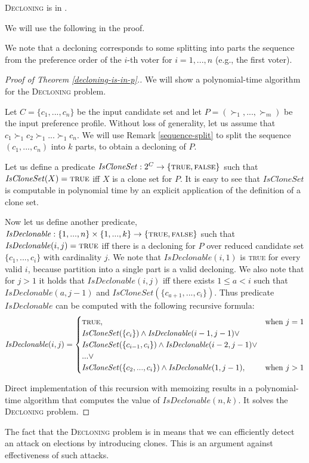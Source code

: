 \begin{thm} \label{decloning-is-in-p}
\textsc{Decloning} is in \p.
\end{thm}

We will use the following in the proof.

\begin{rmrk} \label{sequence-split}
We note that a decloning corresponds to some splitting into parts
the sequence from the preference order of the $i$-th voter for $i=1,...,n$
(e.g., the first voter).
\end{rmrk}

\begin{proof}[Proof of Theorem \ref{decloning-is-in-p}.]
We will show a polynomial-time algorithm for the \textsc{Decloning} problem.

Let $C = \{c_1, ..., c_n\}$ be the input candidate set
and let $P = (\succ_1, ... , \succ_m)$ be the input preference profile.
Without loss of generality, let us assume that $c_1 \succ_1 c_2 \succ_1 ... \succ_1 c_n$.
We will use Remark \ref{sequence-split} to split the sequence $(c_1, ..., c_n)$
into $k$ parts, to obtain a decloning of $P$.

Let us define a predicate
$\mathit{IsCloneSet}: 2^C \rightarrow \{\text{\textsc{true}},\text{\textsc{false}}\}$
such that $\mathit{IsCloneSet}(X) = \text{\textsc{true}}$ iff $X$ is a clone set for $P$.
It is easy to see that $\mathit{IsCloneSet}$ is computable in polynomial time
by an explicit application of the definition of a clone set.

Now let us define another predicate,
$\mathit{IsDeclonable}: \{1,...,n\}\times\{1,...,k\} \rightarrow \{\text{\textsc{true}},\text{\textsc{false}}\}$
such that $\mathit{IsDeclonable}(i,j) = \text{\textsc{true}}$
iff there is a decloning for $P$ over reduced candidate set $\{c_1,...,c_i\}$
with cardinality $j$.
We note that $\mathit{IsDeclonable}(i, 1)$ is \textsc{true} for every valid $i$,
because partition into a single part is a valid decloning.
We also note that for $j>1$ it holds that $\mathit{IsDeclonable}(i,j)$ iff
there exists $1 \leq a < i$ such that $\mathit{IsDeclonable}(a,j-1)$ and $\mathit{IsCloneSet}(\{c_{a+1}, ..., c_i\})$.
Thus predicate $\mathit{IsDeclonable}$ can be computed with the following recursive formula:
$$ \mathit{IsDeclonable}(i,j) =
\begin{cases}
\text{\textsc{true}},	&\text{when $j=1$} \\
\mathit{IsCloneSet}(\{c_i\}) \wedge \mathit{IsDeclonable}(i-1,j-1) \vee \\
\mathit{IsCloneSet}(\{c_{i-1},c_i\}) \wedge \mathit{IsDeclonable}(i-2, j-1) \vee \\
... \vee \\
\mathit{IsCloneSet}(\{c_2,...,c_i\}) \wedge \mathit{IsDeclonable}(1,j-1)
, 		&\text{when $j>1$}
\end{cases}
$$

Direct implementation of this recursion with memoizing
results in a polynomial-time algorithm that computes the value of $IsDeclonable(n,k)$.
It solves the \textsc{Decloning} problem.
\end{proof}


The fact that the \textsc{Decloning} problem is in \p means that we can efficiently
detect an attack on elections by introducing clones.
This is an argument against effectiveness of such attacks.
